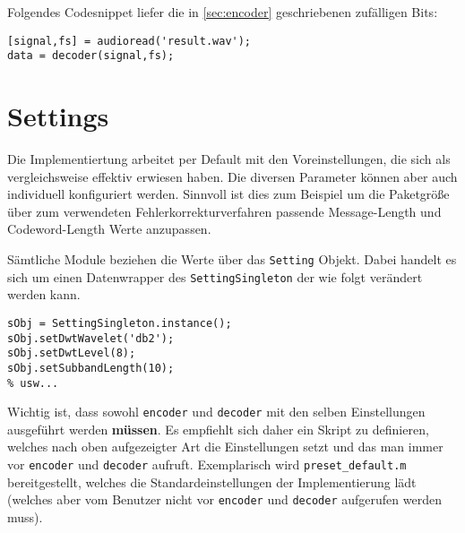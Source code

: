 Folgendes Codesnippet liefer die in \ref{sec:encoder} geschriebenen zufälligen Bits:

\begin{verbatim}
[signal,fs] = audioread('result.wav');
data = decoder(signal,fs);
\end{verbatim}


\section{Settings}

Die Implementiertung arbeitet per Default mit den Voreinstellungen, die sich als vergleichsweise effektiv erwiesen haben. Die diversen Parameter können aber auch individuell konfiguriert werden. Sinnvoll ist dies zum Beispiel um die Paketgröße über zum verwendeten Fehlerkorrekturverfahren passende Message-Length und Codeword-Length Werte anzupassen.

Sämtliche Module beziehen die Werte über das \texttt{Setting} Objekt. Dabei handelt es sich um einen Datenwrapper des \texttt{SettingSingleton} der wie folgt verändert werden kann. 

\begin{verbatim}
sObj = SettingSingleton.instance();
sObj.setDwtWavelet('db2');
sObj.setDwtLevel(8);
sObj.setSubbandLength(10);
% usw...
\end{verbatim}

Wichtig ist, dass sowohl \texttt{encoder} und \texttt{decoder} mit den selben Einstellungen ausgeführt werden \textbf{müssen}. Es empfiehlt sich daher ein Skript zu definieren, welches nach oben aufgezeigter Art die Einstellungen setzt und das man immer vor \texttt{encoder} und \texttt{decoder} aufruft. Exemplarisch wird \texttt{preset\_default.m} bereitgestellt, welches die Standardeinstellungen der Implementierung lädt (welches aber vom Benutzer nicht vor \texttt{encoder} und \texttt{decoder} aufgerufen werden muss).









